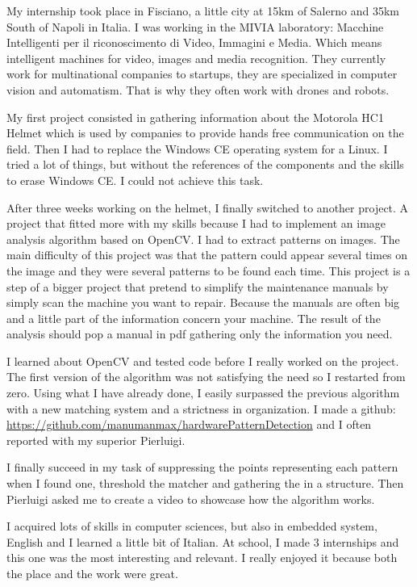 \documentclass[english,a4paper,11pt]{report}
\begin{document}
	\listoffigures
		
	
	
	
	


	\par My internship took place in Fisciano, a little city at 15km of Salerno and 35km South of Napoli in Italia. I was working in the MIVIA laboratory: Macchine Intelligenti per il riconoscimento di Video, Immagini e Media. Which means intelligent machines for video, images and media recognition. They currently work for multinational companies to startups, they are specialized in computer vision and automatism. That is why they often work with drones and robots.
	\par My first project consisted in gathering information about the Motorola HC1 Helmet which is used by companies to provide hands free communication on the field. Then I had to replace the Windows CE operating system for a Linux. I tried a lot of things, but without the references of the components and the skills to erase Windows CE. I could not achieve this task.
	\par After three weeks working on the helmet, I finally switched to another project. A project that fitted more with my skills because I had to implement an image analysis algorithm based on OpenCV. I had to extract patterns on images. The main difficulty of this project was that the pattern could appear several times on the image and they were several patterns to be found each time. This project is a step of a bigger project that pretend to simplify the maintenance manuals by simply scan the machine you want to repair. Because the manuals are often big and a little part of the information concern your machine. The result of the analysis should pop a manual in pdf gathering only the information you need.
	\par I learned about OpenCV and tested code before I really worked on the project. The first version of the algorithm was not satisfying the need so I restarted from zero. Using what I have already done, I easily surpassed the previous algorithm with a new matching system and a strictness in organization. I made a github: \url{https://github.com/manumanmax/hardwarePatternDetection} and I often reported with my superior Pierluigi.
	\par I finally succeed in my task of suppressing the points representing each pattern when I found one, threshold the matcher and gathering the in a structure. Then Pierluigi asked me to create a video to showcase how the algorithm works.
	
	\par I acquired lots of skills in computer sciences, but also in embedded system, English and I learned a little bit of Italian. At school, I made 3 internships and this one was the most interesting and relevant. I really enjoyed it because both the place and the work were great.
	
	
	
\end{document}
